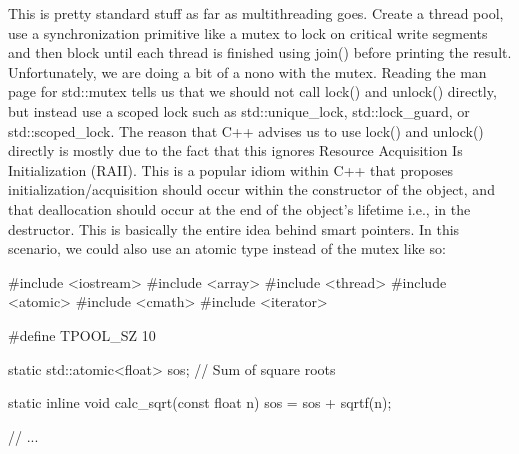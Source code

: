 \documentclass{article}
\begin{document}
This is pretty standard stuff as far as multithreading goes. Create a thread pool, use a synchronization
primitive like a mutex to lock on critical write segments and then block until each thread is finished using
join() before printing the result. Unfortunately, we are doing a bit of a nono with the mutex. Reading the
man page for std::mutex tells us that we should not call lock() and unlock() directly, but instead use a
scoped lock such as std::unique\_lock, std::lock\_guard, or std::scoped\_lock. The reason that C++ advises us
to use lock() and unlock() directly is mostly due to the fact that this ignores Resource Acquisition Is
Initialization (RAII). This is a popular idiom within C++ that proposes initialization/acquisition should
occur within the constructor of the object, and that deallocation should occur at the end of the object's
lifetime i.e., in the destructor. This is basically the entire idea behind smart pointers. In this scenario,
we could also use an atomic type instead of the mutex like so:

\begin{cpplst}
#include <iostream>
#include <array>
#include <thread>
#include <atomic>
#include <cmath>
#include <iterator>

#define TPOOL_SZ 10

static std::atomic<float> sos; // Sum of square roots

static inline void calc_sqrt(const float n)
{
    sos = sos + sqrtf(n);
}

// ...
\end{cpplst}
\end{document}
